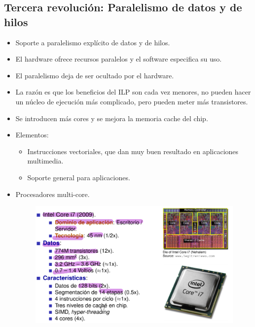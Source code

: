 \documentclass[12pt, twoside, openright]{report} %
\begin{document}
    \subsection{Tercera revolución: Paralelismo de datos y de hilos}

    \begin{itemize}
    \item
      Soporte a paralelismo explícito de datos y de hilos.
    \item
      El hardware ofrece recursos paralelos y el software especifica su
      uso.
    \item
      El paralelismo deja de ser ocultado por el hardware.
    \item
      La razón es que los beneficios del ILP son cada vez menores, no
      pueden hacer un núcleo de ejecución más complicado, pero pueden
      meter más transistores.
    \item
      Se introducen más cores y se mejora la memoria cache del chip.
    \item
      Elementos:

      \begin{itemize}
      
      \item
        Instrucciones vectoriales, que dan muy buen resultado en
        aplicaciones multimedia.
      \item
        Soporte general para aplicaciones.
      \end{itemize}
    \pagebreak
    \item Procesadores multi-core.
      \begin{figure}[H]
        {\includegraphics[scale=.25]{Untitled 4.png}}
      \end{figure}
    \end{itemize}
\end{document}
